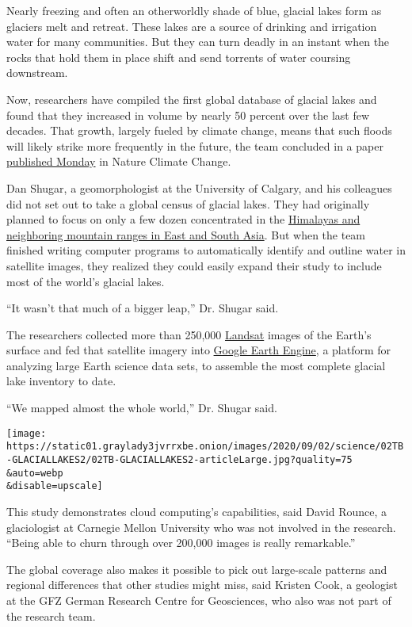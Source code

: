 Nearly freezing and often an otherworldly shade of blue, glacial lakes
form as glaciers melt and retreat. These lakes are a source of drinking
and irrigation water for many communities. But they can turn deadly in
an instant when the rocks that hold them in place shift and send
torrents of water coursing downstream.

Now, researchers have compiled the first global database of glacial
lakes and found that they increased in volume by nearly 50 percent over
the last few decades. That growth, largely fueled by climate change,
means that such floods will likely strike more frequently in the future,
the team concluded in a paper
\href{https://www.nature.com/articles/s41558-020-0855-4}{published
Monday} in Nature Climate Change.

Dan Shugar, a geomorphologist at the University of Calgary, and his
colleagues did not set out to take a global census of glacial lakes.
They had originally planned to focus on only a few dozen concentrated in
the \href{https://nsidc.org/data/highmountainasia}{Himalayas and
neighboring mountain ranges in East and South Asia}. But when the team
finished writing computer programs to automatically identify and outline
water in satellite images, they realized they could easily expand their
study to include most of the world's glacial lakes.

``It wasn't that much of a bigger leap,'' Dr. Shugar said.

The researchers collected more than 250,000
\href{https://landsat.gsfc.nasa.gov}{Landsat} images of the Earth's
surface and fed that satellite imagery into
\href{https://earthengine.google.com}{Google Earth Engine}, a platform
for analyzing large Earth science data sets, to assemble the most
complete glacial lake inventory to date.

``We mapped almost the whole world,'' Dr. Shugar said.

\texttt{[image: https://static01.graylady3jvrrxbe.onion/images/2020/09/02/science/02TB-GLACIALLAKES2/02TB-GLACIALLAKES2-articleLarge.jpg?quality=75\\\&auto=webp\\\&disable=upscale]}

This study demonstrates cloud computing's capabilities, said David
Rounce, a glaciologist at Carnegie Mellon University who was not
involved in the research. ``Being able to churn through over 200,000
images is really remarkable.''

The global coverage also makes it possible to pick out large-scale
patterns and regional differences that other studies might miss, said
Kristen Cook, a geologist at the GFZ German Research Centre for
Geosciences, who also was not part of the research team.

